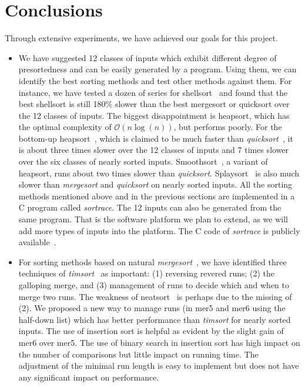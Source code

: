 \documentclass[AMA,STIX1COL]{WileyNJD-v2}
\newcommand{\qusort}{\emph{quicksort }}
\newcommand{\qusortn}{\emph{quicksort}}
\newcommand{\tsort}{\emph{timsort }}
\newcommand{\tsortn}{\emph{timsort}}
\newcommand{\msort}{\emph{mergesort }}
\newcommand{\msortn}{\emph{mergesort}}
\begin{document}
\section{Conclusions}
Through extensive experiments, we have achieved our goals for this project. 
\begin{itemize}
\item We have suggested 12 classes of inputs which exhibit different degree of presortedness and can be easily generated by a program. 
Using them, we can identify the best sorting methods and test other methods against them. 
For instance, we have tested a dozen of series for shellsort~\cite{knuth1998sorting} and found that the best shellsort is still 180\% slower than the best mergesort or quicksort over the 12 classes of inputs. 
The biggest disappointment is heapsort, which has the optimal complexity of $\mathcal{O}(n\log(n))$, but performs poorly. 
For the bottom-up heapsort~\cite{williams1964algorithm}, which is claimed to be much faster than \qusortn~\cite{wegener1993bottom}, it is about three times slower over the 12 classes of inputs and 7 times slower over the six classes of nearly sorted inputs. 
Smoothsort~\cite{dijkstra1982smoothsort}, a variant of heapsort, runs about two times slower than \qusortn. 
Splaysort~\cite{moffat1996splaysort} is also much slower than \msort and \qusort on nearly sorted inputs. 
All the sorting methods  mentioned above and in the previous sections are implemented in a C program called \textit{sortrace}. 
The 12 inputs can also be generated from the same program. 
That is the software platform we plan to extend, as we will add more types of inputs into the platform. 
The C code of \textit{sortrace} is publicly available~\cite{sortracecode}.
\item For sorting methods based on natural \msortn~\cite{mcilroy1993optimistic}, we have identified three techniques of \tsortn~\cite{timsort} as important: (1) reversing revered runs; (2) the galloping merge, and (3) management of runs to decide which and when to merge two runs. 
The weakness of neatsort~\cite{la2014neatsort} is perhaps due to the missing of (2). 
We proposed a new way to manage runs (in mer5 and mer6 using the half-down list) which has better performance than \tsort for nearly sorted inputs. 
The use of insertion sort is helpful as evident by the slight gain of mer6 over mer5. 
The use of binary search in insertion sort has high impact on the number of comparisons but little impact on running time. 
The adjustment of the minimal run length is easy to implement but does not have any significant impact on performance.

\end{itemize}
\end{document}
